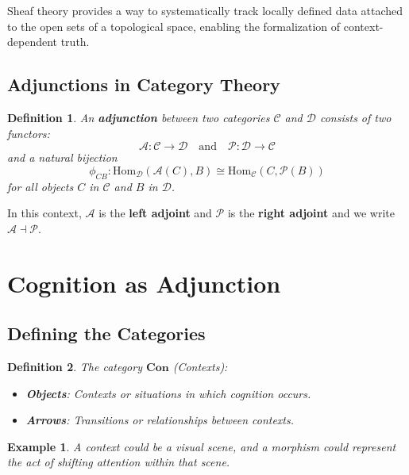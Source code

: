 \documentclass{article}
\newtheorem{definition}{Definition}[section]
\newtheorem{example}{Example}[section]
\begin{document}
Sheaf theory provides a way to systematically track locally defined data attached to the open sets of a topological space, enabling the formalization of context-dependent truth.

\subsection{Adjunctions in Category Theory}

\begin{definition}
    An \textbf{adjunction} between two categories $\mathcal{C}$ and $\mathcal{D}$ consists of two functors:
    \[
        \mathcal{A} \colon \mathcal{C} \to \mathcal{D} \quad \text{and} \quad \mathcal{P} \colon \mathcal{D} \to \mathcal{C}
    \]
    and a natural bijection
    \[
        \phi_{CB} \colon \text{Hom}_{\mathcal{D}} ( \mathcal{A}(C), B ) \cong \text{Hom}_{\mathcal{C}} (C, \mathcal{P}(B))
    \]
    for all objects $C$ in $\mathcal{C}$ and $B$ in $\mathcal{D}$.
\end{definition}

In this context, $\mathcal{A}$ is the \textbf{left adjoint} and $\mathcal{P}$ is the \textbf{right adjoint} and we write $\mathcal{A} \dashv \mathcal{P}$.

\section{Cognition as Adjunction}

\subsection{Defining the Categories}

\begin{definition} The category $\mathbf{Con}$ (Contexts):

    \begin{itemize}
        \item \textbf{Objects}: Contexts or situations in which cognition occurs.
        \item \textbf{Arrows}: Transitions or relationships between contexts.
    \end{itemize}
\end{definition}

\begin{example} A context could be a visual scene, and a morphism could represent the act of shifting attention within that scene. \end{example}
\end{document}
